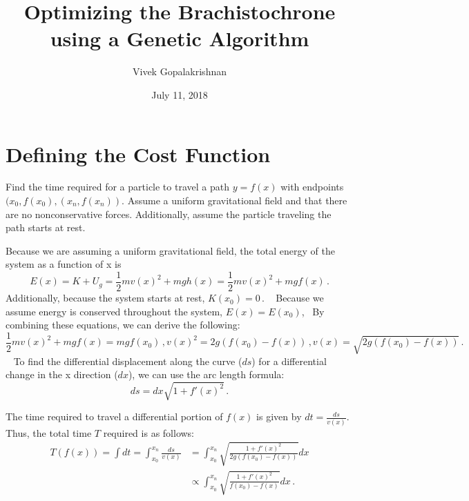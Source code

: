 \documentclass{article}
\title{Optimizing the Brachistochrone using a Genetic Algorithm}
\author{Vivek Gopalakrishnan}
\date{July 11, 2018}
\begin{document}
\maketitle

\section{Defining the Cost Function}
Find the time required for a particle to travel a path $y=f(x)$ with endpoints $(x_0,f(x_0), (x_n, f(x_n))$. Assume a uniform gravitational field and that there are no nonconservative forces. Additionally, assume the particle traveling the path starts at rest.

Because we are assuming a uniform gravitational field, the total energy of the system as a function of x is
\begin{equation}
	E(x) = K + U_g = \frac{1}{2}mv(x)^2 + mgh(x) = \frac{1}{2}mv(x)^2 + mgf(x) \,.
\end{equation}
Additionally, because the system starts at rest, $K(x_0)=0 \,.$
\
Because we assume energy is conserved throughout the system, $E(x) = E(x_0)$, 
\
By combining these equations, we can derive the following:
\begin{subequations}
	\begin{equation}
		\frac{1}{2}mv(x)^2 + mgf(x) = mgf(x_0) \,,
	\end{equation}
	\begin{equation}
		v(x)^2 = 2g(f(x_0) - f(x)) \,,
	\end{equation}
	\begin{equation}
		v(x) = \sqrt{2g(f(x_0) - f(x))} \,.
	\end{equation}
\end{subequations}
\
To find the differential displacement along the curve ($ds$) for a differential change in the x direction ($dx$), we can use the arc length formula:
\begin{equation}
	ds = dx \sqrt{1 + f'(x)^2} \,.
\end{equation}

The time required to travel a differential portion of $f(x)$ is given by $dt = \frac{ds}{v(x)}$. Thus, the total time $T$ required is as follows:
\begin{equation}
	\begin{split}
		T(f(x)) = \int{dt} = \int_{x_0}^{x_n} \frac{ds}{v(x)} &= \int_{x_0}^{x_n} \sqrt{\frac{1 + f'(x)^2}{2g(f(x_0) - f(x))}}dx \\
				        &\propto \int_{x_0}^{x_n} \sqrt{\frac{1 + f'(x)^2}{f(x_0) - f(x)}}dx \,.
	\end{split}
\end{equation}
\end{document}
